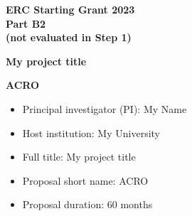 \thispagestyle{fancy}
\begin{titlepage}

\begin{center}
   \large{\textbf{ERC Starting Grant 2023\\
   Part B2 \\
   (not evaluated in Step 1) }
   }
   \vspace{1cm}
   
   \LARGE{\textbf{My project title}}
   
   \vspace{1cm}
   
   \LARGE{\textbf{ACRO}}
   
   \vspace{1cm}
   
\normalsize   
\begin{itemize}
\item Principal investigator (PI): My Name
\item Host institution: My University
\item Full title: My project title
\item Proposal short name: ACRO
\item Proposal duration: 60 months
\end{itemize}
	
\noindent
{}

\vfill

\end{center}

\end{titlepage}
